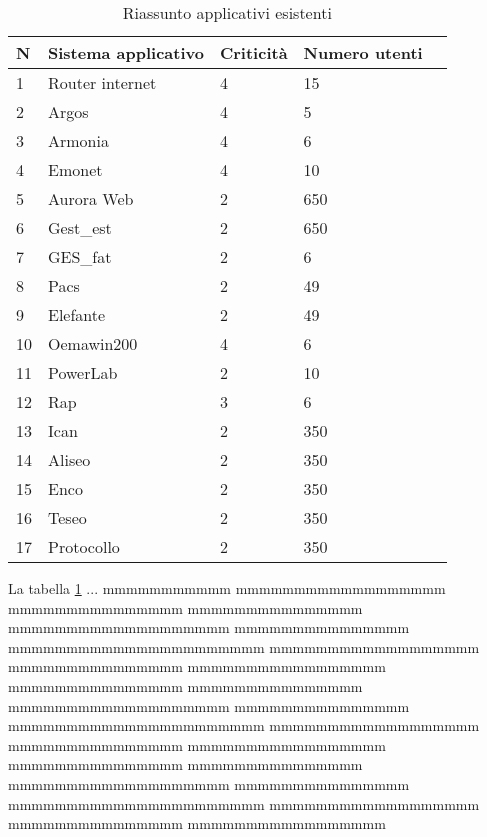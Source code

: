 	\begin{table}[h]
	\begin{tabular}{|l|l|l|l|l|}
		\hline
		\rowcolor[HTML]{EFEFEF} 
		\textbf{N} & \textbf{Sistema applicativo}  & \textbf{Criticità} & \textbf{Numero utenti} \\ \hline
		1  & Router internet	& 4		& 15		\\ \hline
		2  & Argos		& 4		& 5		\\ \hline
		3  & Armonia		& 4		& 6		\\ \hline
		4  & Emonet				& 4		& 10		\\ \hline
		5  & Aurora Web		& 2		& 650		\\ \hline
		6  & Gest\_est			& 2		& 650		\\ \hline
		7  & GES\_fat			& 2		& 6		\\ \hline
		8  & Pacs		& 2		& 49		\\ \hline
		9  & Elefante		& 2		& 49		\\ \hline
		10  & Oemawin200		& 4		& 6		\\ \hline
		11  & PowerLab						& 2		& 10		\\ \hline
		12  & Rap				& 3		& 6		\\ \hline
		13  & Ican		& 2		& 350 	\\ \hline
		14  & Aliseo			& 2		& 350 	\\ \hline
		15  & Enco		& 2		& 350 	\\ \hline
		16  & Teseo			& 2		& 350 	\\ \hline
		17  & Protocollo			& 2		& 350 	\\ \hline
	\end{tabular}
	\caption{Riassunto applicativi esistenti}\label{tab:tecnologie}
	\end{table}

La tabella \ref{tab:tecnologie} ... mmmmmmmmmmm mmmmmmmmmmmmmmmmmm mmmmmmmmmmmmmmm mmmmmmmmmmmmmmm mmmmmmmmmmmmmmmmmmm mmmmmmmmmmmmmmm mmmmmmmmmmmmmmmmmmmmmm mmmmmmmmmmmmmmmmmm mmmmmmmmmmmmmmm mmmmmmmmmmmmmmmmm mmmmmmmmmmmmmmm mmmmmmmmmmmmmmm mmmmmmmmmmmmmmmmmmm mmmmmmmmmmmmmmm mmmmmmmmmmmmmmmmmmmmmm mmmmmmmmmmmmmmmmmm mmmmmmmmmmmmmmm mmmmmmmmmmmmmmmmm mmmmmmmmmmmmmmm mmmmmmmmmmmmmmm mmmmmmmmmmmmmmmmmmm mmmmmmmmmmmmmmm mmmmmmmmmmmmmmmmmmmmmm mmmmmmmmmmmmmmmmmm mmmmmmmmmmmmmmm mmmmmmmmmmmmmmmmm 

	
